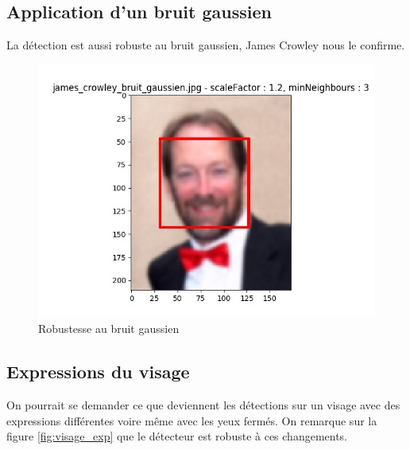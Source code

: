 \documentclass[a4paper,11pt]{article}
\begin{document}
    \subsection{Application d'un bruit gaussien}

	La détection est aussi robuste au bruit gaussien, James Crowley nous le confirme.

	    \begin{figure}[H]
	        \begin{center}
	           \includegraphics[scale = 0.6]{images/james_crowley_bruit_gaussien_1,2_3.png}
	           \caption{Robustesse au bruit gaussien}
	           \label{fig:edward}
	        \end{center}
	    \end{figure}
	    

    \subsection{Expressions du visage}
	
	On pourrait se demander ce que deviennent les détections sur un visage avec des expressions
	différentes voire même avec les yeux fermés. On remarque sur la figure \ref{fig:visage_exp}
	que le détecteur est robuste à ces changements.
\end{document}
